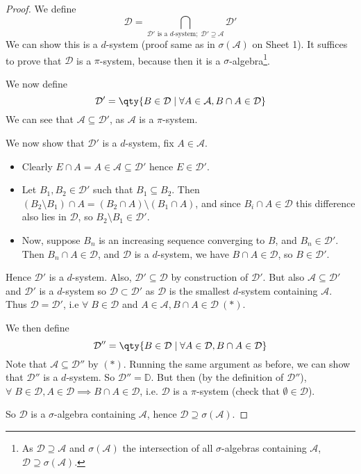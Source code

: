 \begin{proof}
	We define
	\[ \mathcal D = \bigcap_{\mathcal D' \text{ is a } d \text{-system};\; \mathcal D' \supseteq \mathcal A} \mathcal D' \]
	We can show this is a $d$-system (proof same as in $\sigma(\mathcal{A})$ on Sheet 1).
	It suffices to prove that $\mathcal D$ is a $\pi$-system, because then it is a $\sigma$-algebra\footnote{As $\mathcal{D} \supseteq \mathcal{A}$ and $\sigma(\mathcal{A})$ the intersection of all $\sigma$-algebras containing $\mathcal{A}$, $\mathcal{D} \supseteq \sigma(\mathcal{A})$.}.

	We now define
	\[ \mathcal D' = \qty{B \in \mathcal D \mid \forall A \in \mathcal A, B \cap A \in \mathcal D} \]
	We can see that $\mathcal A \subseteq \mathcal{D}'$, as $\mathcal A$ is a $\pi$-system.

	We now show that $\mathcal D'$ is a $d$-system, fix $A \in \mathcal{A}$.
	\begin{itemize}
		\item Clearly $E \cap A = A \in \mathcal A \subseteq \mathcal D'$ hence $E \in \mathcal D'$.
		\item Let $B_1, B_2 \in \mathcal D'$ such that $B_1 \subseteq B_2$.
		Then $(B_2 \setminus B_1) \cap A = (B_2 \cap A) \setminus (B_1 \cap A)$, and since $B_i \cap A \in \mathcal D$ this difference also lies in $\mathcal D$, so $B_2 \setminus B_1 \in \mathcal D'$.
		\item Now, suppose $B_n$ is an increasing sequence converging to $B$, and $B_n \in \mathcal D'$.
		Then $B_n \cap A \in \mathcal D$, and $\mathcal D$ is a $d$-system, we have $B \cap A \in \mathcal D$, so $B \in \mathcal D'$.
	\end{itemize}

	Hence $\mathcal D'$ is a $d$-system.
	Also, $\mathcal D' \subseteq \mathcal D$ by construction of $\mathcal D'$.
	But also $\mathcal{A} \subseteq \mathcal{D}'$ and $\mathcal{D}'$ is a $d$-system so $\mathcal{D} \subset \mathcal{D}'$ as $\mathcal{D}$ is the smallest $d$-system containing $\mathcal{A}$.
	Thus $\mathcal D = \mathcal D'$, i.e $\forall \; B \in \mathcal{D}$ and $A \in \mathcal{A}, B \cap A \in \mathcal{D} \ (\ast)$.

	We then define
	\[ \mathcal D'' = \qty{B \in \mathcal D \mid \forall A \in \mathcal D, B \cap A \in \mathcal D} \]
	Note that $\mathcal A \subseteq \mathcal D''$ by $(\ast)$.
	Running the same argument as before, we can show that $\mathcal D''$ is a $d$-system. So $\mathcal{D}'' = \mathbb{D}$.
	But then (by the definition of $\mathcal{D}''$), $\forall \; B \in \mathcal{D}, A \in \mathcal{D} \implies B \cap A \in \mathcal{D}$, i.e. $\mathcal{D}$ is a $\pi$-system (check that $\emptyset \in \mathcal{D}$).

	So $\mathcal{D}$ is a $\sigma$-algebra containing $\mathcal{A}$, hence $\mathcal{D} \supseteq \sigma(\mathcal{A})$.
\end{proof}

